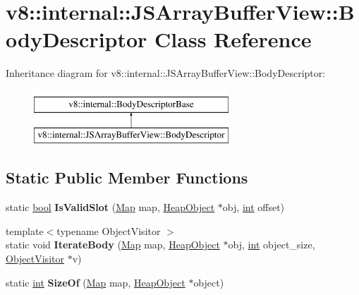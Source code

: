 \hypertarget{classv8_1_1internal_1_1JSArrayBufferView_1_1BodyDescriptor}{}\section{v8\+:\+:internal\+:\+:J\+S\+Array\+Buffer\+View\+:\+:Body\+Descriptor Class Reference}
\label{classv8_1_1internal_1_1JSArrayBufferView_1_1BodyDescriptor}
Inheritance diagram for v8\+:\+:internal\+:\+:J\+S\+Array\+Buffer\+View\+:\+:Body\+Descriptor\+:\begin{figure}[H]
\begin{center}
\leavevmode
\includegraphics[height=2.000000cm]{classv8_1_1internal_1_1JSArrayBufferView_1_1BodyDescriptor}
\end{center}
\end{figure}
\subsection*{Static Public Member Functions}
\begin{DoxyCompactItemize}
\item 
\mbox{\label{classv8_1_1internal_1_1JSArrayBufferView_1_1BodyDescriptor_a65a6024dc49f1aa833de5c55cf5db9bf}} 
static \mbox{\hyperlink{classbool}{bool}} {\bfseries Is\+Valid\+Slot} (\mbox{\hyperlink{classv8_1_1internal_1_1Map}{Map}} map, \mbox{\hyperlink{classv8_1_1internal_1_1HeapObject}{Heap\+Object}} $\ast$obj, \mbox{\hyperlink{classint}{int}} offset)
\item 
\mbox{\label{classv8_1_1internal_1_1JSArrayBufferView_1_1BodyDescriptor_ac141386b01753b1e41827265cb509558}} 
{\footnotesize template$<$typename Object\+Visitor $>$ }\\static void {\bfseries Iterate\+Body} (\mbox{\hyperlink{classv8_1_1internal_1_1Map}{Map}} map, \mbox{\hyperlink{classv8_1_1internal_1_1HeapObject}{Heap\+Object}} $\ast$obj, \mbox{\hyperlink{classint}{int}} object\+\_\+size, \mbox{\hyperlink{classv8_1_1internal_1_1ObjectVisitor}{Object\+Visitor}} $\ast$v)
\item 
\mbox{\label{classv8_1_1internal_1_1JSArrayBufferView_1_1BodyDescriptor_a8d3ad7cccc7bad2ef613e1c90ecdf5dd}} 
static \mbox{\hyperlink{classint}{int}} {\bfseries Size\+Of} (\mbox{\hyperlink{classv8_1_1internal_1_1Map}{Map}} map, \mbox{\hyperlink{classv8_1_1internal_1_1HeapObject}{Heap\+Object}} $\ast$object)
\end{DoxyCompactItemize}
